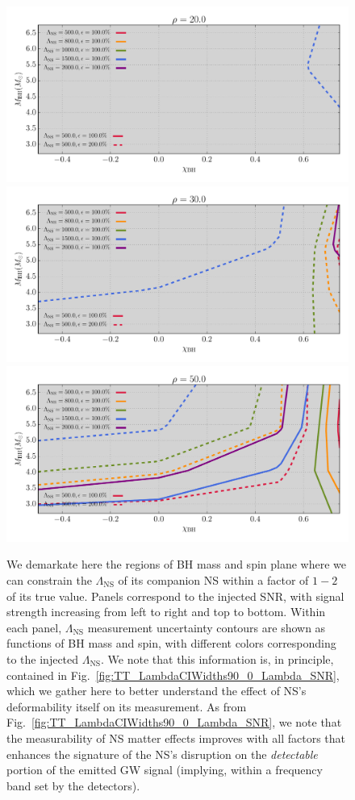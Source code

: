 \documentclass[aps,prd,amsmath,floats,floatfix, twocolumn,
superscriptaddress,nofootinbib,showpacs]{revtex4-1}
\newcommand{\lambdans}{\Lambda_\mathrm{NS}}
\begin{document}
\begin{figure}
\centering    
\includegraphics[width=.68\columnwidth]{plots/TTLambdaErrorCurves_BHspin_BHmass_SNR20_CI90_0.pdf}
\includegraphics[width=.68\columnwidth]{plots/TTLambdaErrorCurves_BHspin_BHmass_SNR30_CI90_0.pdf}
\includegraphics[width=.68\columnwidth]{plots/TTLambdaErrorCurves_BHspin_BHmass_SNR50_CI90_0.pdf}\\
\caption{We demarkate here the regions of BH mass and spin plane where we can 
constrain the $\lambdans$ of its companion NS within a factor of $1-2$ of its true value.
Panels correspond to the injected SNR, with signal strength increasing
from left to right and top to bottom. Within each panel, $\lambdans$ measurement uncertainty
contours are shown as functions of BH mass and spin, with different colors corresponding to the
injected $\lambdans$. We note that this information is, in principle, contained in 
Fig.~\ref{fig:TT_LambdaCIWidths90_0_Lambda_SNR}, which we gather here to better understand
the effect of NS's deformability itself on its measurement. As from Fig.~\ref{fig:TT_LambdaCIWidths90_0_Lambda_SNR}, we note that the measurability of NS matter
effects improves with all factors that enhances the signature of the NS's disruption on
the \textit{detectable} portion of the emitted GW signal (implying, within a frequency band
set by the detectors).
}
\label{fig:TT_LambdaErrorCurves_BHspin_BHmass_CI90_0}
\end{figure}
\end{document}
